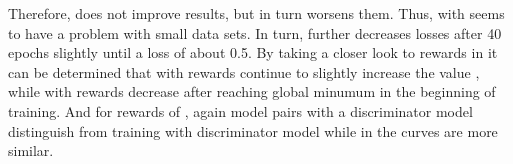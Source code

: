 Therefore, \origsampling does not improve results, but in turn worsens them.
Thus, \kbgan with \origsampling seems to have a problem with small data sets.
In turn, \ussoftmax further decreases losses after 40 epochs slightly until a loss of about 0.5.
By taking a closer look to rewards in  it can be determined that with \origsampling rewards continue to slightly increase the value , while with \ussoftmax rewards decrease after reaching global minumum in the beginning of training. 
And for rewards of \ussoftmax, again model pairs with a \transd discriminator model distinguish from training with \transe discriminator model while in \origisampling the curves are more similar.